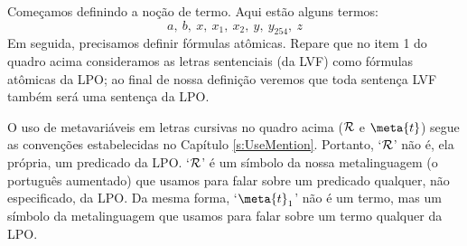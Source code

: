 Começamos definindo a noção de termo.
Aqui estão alguns termos:
	$$a, \ b, \ x, \ x_1, \ x_2, \ y, \ y_{254}, \ z$$
Em seguida, precisamos definir fórmulas atômicas.
Repare que no item 1 do quadro acima consideramos as letras sentenciais (da LVF) como fórmulas atômicas da LPO; ao final de nossa definição veremos que toda sentença LVF também será uma sentença da LPO.



O uso de metavariáveis em letras cursivas no quadro acima ($\mathcal{R}$ e $\meta{t}$) segue as convenções estabelecidas no Capítulo \ref{s:UseMention}.
Portanto, `$\mathcal{R}$' não é, ela própria, um predicado da LPO.
`$\mathcal{R}$' é um símbolo da nossa metalinguagem (o português aumentado) que usamos para falar sobre um predicado qualquer, não especificado, da LPO.
Da mesma forma, `$\meta{t}_1$' não é um termo, mas um símbolo da metalinguagem que usamos para falar sobre um termo qualquer da LPO.

